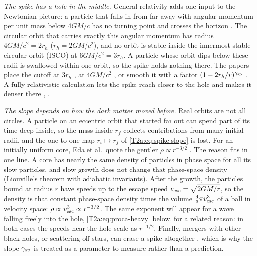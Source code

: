 \emph{The spike has a hole in the middle.} General relativity adds one input to the Newtonian picture: a particle that falls in from far away with angular momentum per unit mass below $4GM/c$ has no turning point and crosses the horizon \cite{Sadeghian2013}. The circular orbit that carries exactly this angular momentum has radius $4GM/c^2=2r_h$ ($r_h=2GM/c^2$), and no orbit is stable inside the innermost stable circular orbit (ISCO) at $6GM/c^2=3r_h$. A particle whose orbit dips below these radii is swallowed within one orbit, so the spike holds nothing there. The papers place the cutoff at $3r_h$ \cite[Sec.~II B]{Eda2015}, at $4GM/c^2$ \cite{Coogan2022}, or smooth it with a factor $(1-2r_h/r)^{\gamma_{\rm sp}}$ \cite[eq.~(6)]{Kim2023}. A fully relativistic calculation lets the spike reach closer to the hole and makes it denser there \cite{Sadeghian2013}, \cite[Sec.~II]{Speeney2022}.

\emph{The slope depends on how the dark matter moved before.} Real orbits are not all circles. A particle on an eccentric orbit that started far out can spend part of its time deep inside, so the mass inside $r_f$ collects contributions from many initial radii, and the one-to-one map $r_i\mapsto r_f$ of \eqref{T2a:eq:spike-slope} is lost. For an initially uniform core, Eda et al.\ quote the gentler $\rho\propto r^{-3/2}$ \cite[Sec.~II B]{Eda2015}. The reason fits in one line. A core has nearly the same density of particles in phase space for all its slow particles, and slow growth does not change that phase-space density (Liouville's theorem with adiabatic invariants). After the growth, the particles bound at radius $r$ have speeds up to the escape speed $v_{\rm esc}=\sqrt{2GM/r}$, so the density is that constant phase-space density times the volume $\tfrac43\pi v_{\rm esc}^3$ of a ball in velocity space: $\rho\propto v_{\rm esc}^3\propto r^{-3/2}$. The same exponent will appear for a wave falling freely into the hole, \eqref{T2a:eq:proca-heavy} below, for a related reason: in both cases the speeds near the hole scale as $r^{-1/2}$. Finally, mergers with other black holes, or scattering off stars, can erase a spike altogether \cite{Coogan2022}, which is why the slope $\gamma_{\rm sp}$ is treated as a parameter to measure rather than a prediction.

